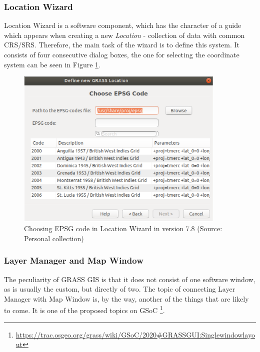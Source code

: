 \documentclass[a4paper,10pt,twoside]{article}
\begin{document}
\subsubsection{Location Wizard}
\label{subsection:wizard}
\noindent
\large
Location Wizard is a software component, which has the character of a guide which appears when creating a new \textit{Location} - collection of data with common CRS/SRS. Therefore, the main task of the wizard is to define this system. It consists of four consecutive dialog boxes, the one for selecting the coordinate system can be seen in Figure \ref{fig:loc_wizard_sour_pred}.

\vspace{0.3cm}
\begin{figure}[hbt!]
\begin{center}
\includegraphics[width=10cm]{../pictures/loc_wizard_sour_pred.png} 
\caption[Choosing EPSG code in Location Wizard in version 7.8]{Choosing EPSG code in Location Wizard in version 7.8 (Source: Personal collection)}
\label{fig:loc_wizard_sour_pred}
\end{center}
\end{figure}

\newpage
\vspace*{-1cm}
\subsubsection{Layer Manager and Map Window}

\noindent The peculiarity of GRASS GIS is that it does not consist of one software window, as is usually the custom, but directly of two. The topic of connecting Layer Manager with Map Window is, by the way, another of the things that are likely to come. It is one of the proposed topics on GSoC \footnote{\url{https://trac.osgeo.org/grass/wiki/GSoC/2020\#GRASSGUI:Singlewindowlayout}}.
\end{document}
